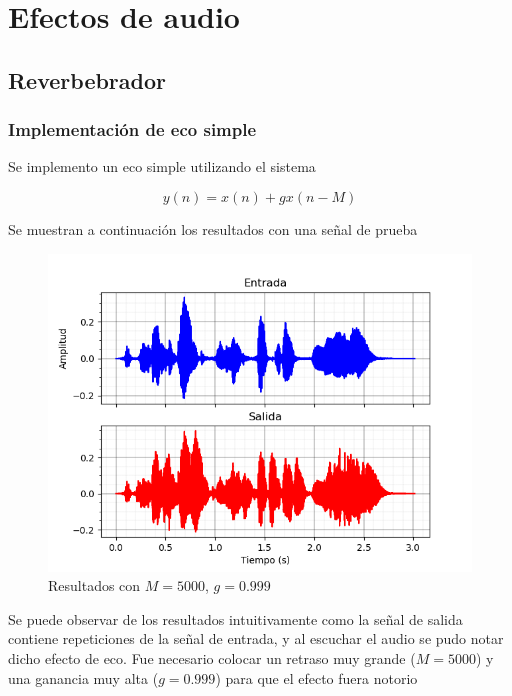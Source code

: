 \documentclass[assd_tp2_main.tex]{subfiles}
\begin{document}
\section{Efectos de audio}

\subsection{Reverbebrador}

\subsubsection{Implementación de eco simple}

Se implemento un eco simple utilizando el sistema

\begin{equation}
	y(n)=x(n)+gx(n-M)
\end{equation}

Se muestran a continuación los resultados con una señal de prueba

\begin{figure}[H]	
	\centering
	\includegraphics[scale=1]{graficos/EJ8/eco_simple.png}
	\caption{Resultados con $M=5000$, $g=0.999$ }
	\label{fig:bloqueElemental}
\end{figure}

Se puede observar de los resultados intuitivamente como la señal de salida contiene repeticiones de la señal de entrada, y al escuchar el audio se pudo notar dicho efecto de eco. Fue necesario colocar un retraso muy grande ($M=5000$) y una ganancia muy alta ($g=0.999$) para que el efecto fuera notorio
\end{document}
